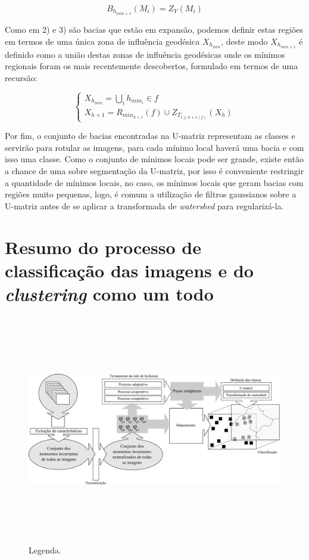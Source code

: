\begin{equation}\label{eq:watershed_caso3}
  B_{h_{min + 1}}(M_i) = Z_Y(M_i)
\end{equation}

Como em 2) e 3) são bacias que estão em expansão, podemos definir estas regiões em termos
de uma única zona de influência geodésica $ X_{h_{min}} $, deste modo
$ X_{h_{min + 1}} $ é definido como a união destas zonas de influência geodésicas
onde os mínimos regionais foram os mais recentemente descobertos,
formulado em termos de uma recursão:

\begin{equation}\label{eq:watershed_recursao}
  \left\{
    \begin{array}{l}
      X_{h_{min}} = \bigcup_i h_{min_{i}} \in f \\
      X_{h + 1} = R_{min_{h + 1}}(f) \cup Z_{T_{t \le {h + 1}(f)}}(X_h)
    \end{array}
  \right.
\end{equation}

Por fim, o conjunto de bacias encontradas na U-matriz representam as classes e
servirão para rotular as imagens, para cada mínimo local haverá uma bacia e com
isso uma classe. Como o conjunto de mínimos locais pode ser grande, existe então
a chance de uma sobre segmentação da U-matriz, por isso é conveniente restringir
a quantidade de mínimos locais, no caso, os mínimos locais que geram bacias
com regiões muito pequenas, logo, é comum a utilização de filtros gaussianos
sobre a U-matriz antes de se aplicar a transformada de \textit{watershed} para
regularizá-la.

\section{Resumo do processo de classificação das imagens e do \textit{clustering}
como um todo}\label{sec:resumo_clustering}

\begin{landscape}
  \begin{figure}[H]
    \begin{center}
      \includegraphics[height=10cm]{imagens/classificacao.pdf}
    \end{center}
    \caption{ Legenda. }
    \label{fig:classificacao}
  \end{figure}
\end{landscape}
